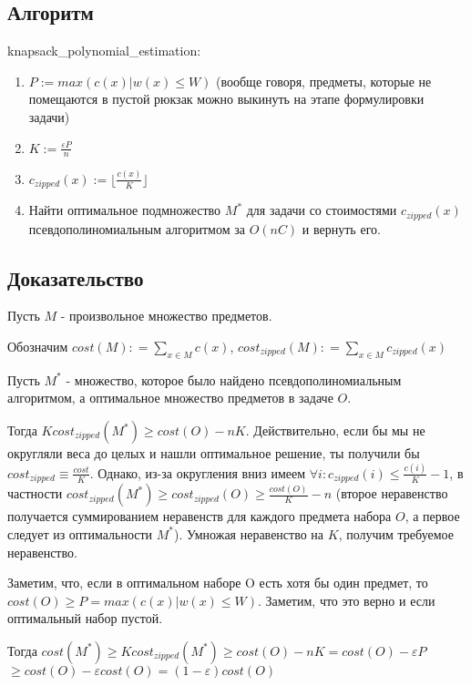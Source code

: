\documentclass{article}
\begin{document}
	\subsection{Алгоритм}

	knapsack\_polynomial\_estimation:
\begin{enumerate}
	\item $P := max(c(x) | w(x) \leq W)$ (вообще говоря, предметы, которые не помещаются в пустой рюкзак можно выкинуть на этапе формулировки задачи)
	\item $K := \frac{\varepsilon P}{n}$
	\item $c_{zipped}(x) := \lfloor \frac{c(x)}{K} \rfloor $
	\item Найти оптимальное подмножество $M^*$ для задачи со стоимостями $c_{zipped}(x)$ псевдополиномиальным алгоритмом за $O(nC)$ и вернуть его.
\end{enumerate}

	\subsection{Доказательство}
	
	Пусть $M$ - произвольное множество предметов.
	
	Обозначим $cost(M) : = \sum\limits_{x \in M} c(x)$,  $cost_{zipped}(M) : = \sum\limits_{x \in M} c_{zipped}(x)$
	
	Пусть $M^*$ - множество, которое было найдено псевдополиномиальным алгоритмом, а оптимальное множество предметов в задаче $O$.
	
	Тогда $K cost_{zipped}(M^*) \geq cost(O) -  nK$. Действительно, если бы мы не округляли веса до целых и нашли оптимальное решение, ты получили бы $ cost_{zipped} \equiv \frac{cost}{K}$. Однако, из-за округления вниз имеем  $\forall i: c_{zipped}(i) \leq \frac{c(i)}{K} - 1$, в частности $cost_{zipped}(M^*) \geq cost_{zipped}(O) \geq \frac{cost(O)}{K} - n$ (второе неравенство получается суммированием неравенств для каждого предмета набора $O$, а первое следует из оптимальности $M^*$). Умножая неравенство на $K$, получим требуемое неравенство.
	
	Заметим, что, если в оптимальном наборе O есть хотя бы один предмет, то 
	$cost(O) \geq P = max(c(x) | w(x) \leq W)$. Заметим, что это верно и если оптимальный набор пустой.
	
	Тогда $cost(M^*) \geq $$ K cost_{zipped} (M^*) \geq $$ cost(O) -  nK $$= cost(O) - \varepsilon P $$ \geq cost(O) - \varepsilon cost(O) $$ = (1 - \varepsilon) cost(O)$
	
\end{document}
